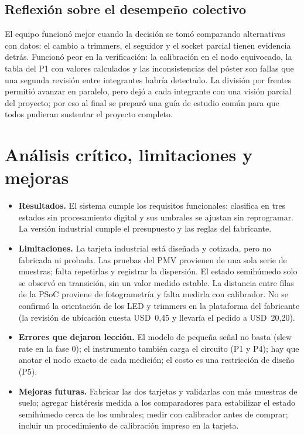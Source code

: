 \documentclass[11pt,a4paper]{article}
\begin{document}
\subsection{Reflexión sobre el desempeño colectivo}
El equipo funcionó mejor cuando la decisión se tomó comparando alternativas con datos: el cambio a trimmers, el seguidor y el socket parcial tienen evidencia detrás. Funcionó peor en la verificación: la calibración en el nodo equivocado, la tabla del P1 con valores calculados y las inconsistencias del póster son fallas que una segunda revisión entre integrantes habría detectado. La división por frentes permitió avanzar en paralelo, pero dejó a cada integrante con una visión parcial del proyecto; por eso al final se preparó una guía de estudio común para que todos pudieran sustentar el proyecto completo.

\section{Análisis crítico, limitaciones y mejoras}\label{sec:critico}
\begin{itemize}
\item \textbf{Resultados.} El sistema cumple los requisitos funcionales: clasifica en tres estados sin procesamiento digital y sus umbrales se ajustan sin reprogramar. La versión industrial cumple el presupuesto y las reglas del fabricante.
\item \textbf{Limitaciones.} La tarjeta industrial está diseñada y cotizada, pero no fabricada ni probada. Las pruebas del PMV provienen de una sola serie de muestras; falta repetirlas y registrar la dispersión. El estado semihúmedo solo se observó en transición, sin un valor medido estable. La distancia entre filas de la PSoC proviene de fotogrametría y falta medirla con calibrador. No se confirmó la orientación de los LED y trimmers en la plataforma del fabricante (la revisión de ubicación cuesta USD~0,45 y llevaría el pedido a USD~20,20).
\item \textbf{Errores que dejaron lección.} El modelo de pequeña señal no basta (slew rate en la fase 0); el instrumento también carga el circuito (P1 y P4); hay que anotar el nodo exacto de cada medición; el costo es una restricción de diseño (P5).
\item \textbf{Mejoras futuras.} Fabricar las dos tarjetas y validarlas con más muestras de suelo; agregar histéresis medida a los comparadores para estabilizar el estado semihúmedo cerca de los umbrales; medir con calibrador antes de comprar; incluir un procedimiento de calibración impreso en la tarjeta.
\end{itemize}
\end{document}
